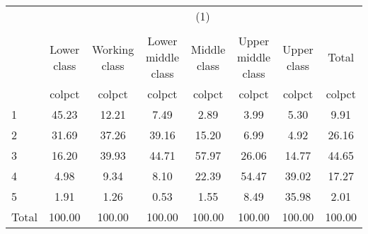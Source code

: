 {
\def\sym#1{\ifmmode^{#1}\else\(^{#1}\)\fi}
\begin{tabular}{l*{7}{c}}
\hline\hline
            &\multicolumn{7}{c}{(1)}                                                                   \\
            &\multicolumn{7}{c}{}                                                                      \\
            & Lower class&Working class&Lower middle class&Middle class&Upper middle class& Upper class&       Total\\
            &      colpct&      colpct&      colpct&      colpct&      colpct&      colpct&      colpct\\
\hline
1           &       45.23&       12.21&        7.49&        2.89&        3.99&        5.30&        9.91\\
2           &       31.69&       37.26&       39.16&       15.20&        6.99&        4.92&       26.16\\
3           &       16.20&       39.93&       44.71&       57.97&       26.06&       14.77&       44.65\\
4           &        4.98&        9.34&        8.10&       22.39&       54.47&       39.02&       17.27\\
5           &        1.91&        1.26&        0.53&        1.55&        8.49&       35.98&        2.01\\
Total       &      100.00&      100.00&      100.00&      100.00&      100.00&      100.00&      100.00\\
\hline\hline
\end{tabular}
}
